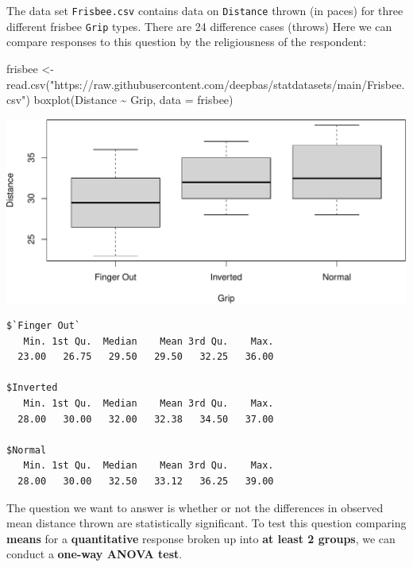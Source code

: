 \documentclass[
]{book}
\newenvironment{Shaded}{\begin{snugshade}}{\end{snugshade}}
\newcommand{\AttributeTok}[1]{\textcolor[rgb]{0.77,0.63,0.00}{#1}}
\newcommand{\FunctionTok}[1]{\textcolor[rgb]{0.00,0.00,0.00}{#1}}
\newcommand{\NormalTok}[1]{#1}
\newcommand{\OtherTok}[1]{\textcolor[rgb]{0.56,0.35,0.01}{#1}}
\newcommand{\SpecialCharTok}[1]{\textcolor[rgb]{0.00,0.00,0.00}{#1}}
\newcommand{\StringTok}[1]{\textcolor[rgb]{0.31,0.60,0.02}{#1}}
\begin{document}
The data set \texttt{Frisbee.csv} contains data on \texttt{Distance} thrown (in paces) for three different frisbee \texttt{Grip} types. There are 24 difference cases (throws) Here we can compare responses to this question by the religiousness of the respondent:

\begin{Shaded}
\begin{Highlighting}[]
\NormalTok{frisbee }\OtherTok{\textless{}{-}} \FunctionTok{read.csv}\NormalTok{(}\StringTok{"https://raw.githubusercontent.com/deepbas/statdatasets/main/Frisbee.csv"}\NormalTok{)}
\FunctionTok{boxplot}\NormalTok{(Distance }\SpecialCharTok{\textasciitilde{}}\NormalTok{ Grip, }\AttributeTok{data =}\NormalTok{ frisbee)}
\end{Highlighting}
\end{Shaded}

\includegraphics[width=1\linewidth]{Class_Activity_23_files/figure-latex/unnamed-chunk-1-1}

\begin{Shaded}
\end{Shaded}

\begin{verbatim}
$`Finger Out`
   Min. 1st Qu.  Median    Mean 3rd Qu.    Max. 
  23.00   26.75   29.50   29.50   32.25   36.00 

$Inverted
   Min. 1st Qu.  Median    Mean 3rd Qu.    Max. 
  28.00   30.00   32.00   32.38   34.50   37.00 

$Normal
   Min. 1st Qu.  Median    Mean 3rd Qu.    Max. 
  28.00   30.00   32.50   33.12   36.25   39.00 
\end{verbatim}

The question we want to answer is whether or not the differences in observed mean distance thrown are statistically significant. To test this question comparing \textbf{means} for a \textbf{quantitative} response broken up into \textbf{at least 2 groups}, we can conduct a \textbf{one-way ANOVA test}.
\end{document}
